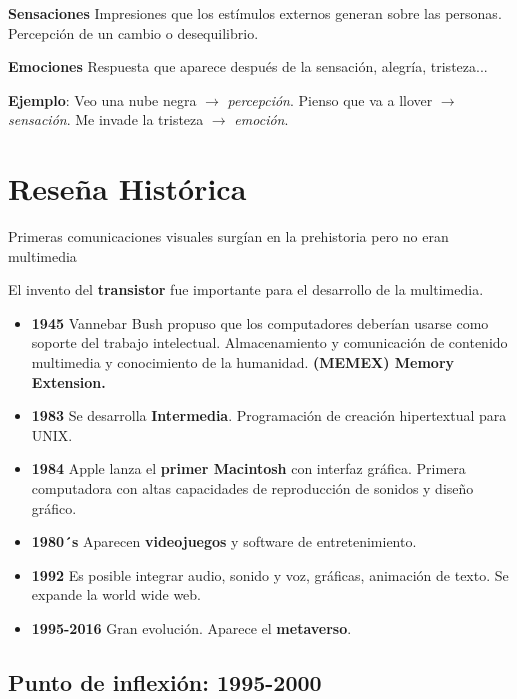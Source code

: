 \documentclass[11pt,a4paper]{article}
\begin{document}
	\begin{DefBox}
		\textbf{Sensaciones} Impresiones que los estímulos externos generan sobre las personas. Percepción de un cambio o desequilibrio.
	\end{DefBox}

	\begin{DefBox}
		\textbf{Emociones} Respuesta que aparece después de la sensación, alegría, tristeza...
	\end{DefBox}

	\textbf{Ejemplo}:
	Veo una nube negra $\rightarrow$ \textit{percepción}.
	Pienso que va a llover $\rightarrow$ \textit{sensación}.
	Me invade la tristeza $\rightarrow$ \textit{emoción}.

	\section{Reseña Histórica}
	Primeras comunicaciones visuales surgían en la prehistoria pero no eran multimedia

	El invento del \textbf{transistor} fue importante para el desarrollo de la multimedia.

	\begin{itemize}[]
		\item \textbf{1945} Vannebar Bush propuso que los computadores deberían usarse como soporte del trabajo intelectual. Almacenamiento y comunicación de contenido multimedia y conocimiento de la humanidad. \textbf{(MEMEX) Memory Extension.}

		\item \textbf{1983} Se desarrolla \textbf{Intermedia}. Programación de creación hipertextual para UNIX.

		\item \textbf{1984} Apple lanza el \textbf{primer Macintosh} con interfaz gráfica. Primera computadora con altas capacidades de reproducción de sonidos y diseño gráfico.

		\item \textbf{1980´s} Aparecen \textbf{videojuegos} y software de entretenimiento.

		\item \textbf{1992} Es posible integrar audio, sonido  y voz, gráficas, animación de texto. Se expande la world wide web.

		\item \textbf{1995-2016} Gran evolución. Aparece el \textbf{metaverso}.
	\end{itemize}

	\subsection{Punto de inflexión: 1995-2000}
\end{document}
